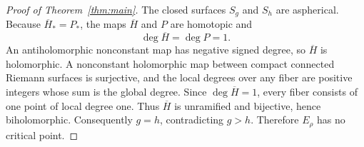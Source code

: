 \documentclass[10pt,a4paper]{amsart}
\begin{document}
\begin{proof}[Proof of Theorem~\ref{thm:main}]
The closed surfaces $S_g$ and $S_h$ are aspherical.  Because
$\overline H_*=P_*$, the maps $\overline H$ and $P$ are homotopic and
\[
 \deg\overline H=\deg P=1.
\]
An antiholomorphic nonconstant map has negative signed degree, so
$\overline H$ is holomorphic.  A nonconstant holomorphic map between compact
connected Riemann surfaces is surjective, and the local degrees over any
fiber are positive integers whose sum is the global degree.  Since
$\deg\overline H=1$, every fiber consists of one point of local degree one.
Thus $\overline H$ is unramified and bijective, hence biholomorphic.
Consequently $g=h$, contradicting $g>h$.  Therefore $E_\rho$ has no critical
point.
\end{proof}
\end{document}
